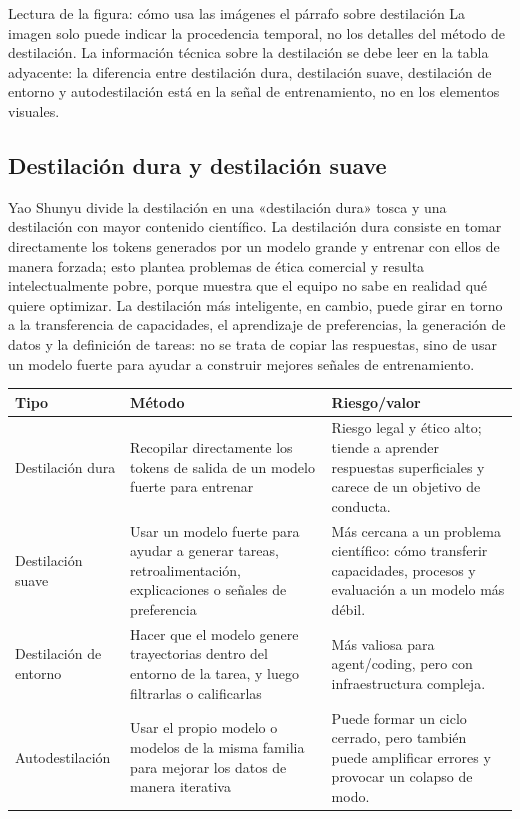 \documentclass[a4paper]{article}
\begin{document}
\begin{knowledgebox}{Lectura de la figura: cómo usa las imágenes el párrafo sobre destilación}
La imagen solo puede indicar la procedencia temporal, no los detalles del método de destilación. La información técnica sobre la destilación se debe leer en la tabla adyacente: la diferencia entre destilación dura, destilación suave, destilación de entorno y autodestilación está en la señal de entrenamiento, no en los elementos visuales.
\end{knowledgebox}


\subsection{Destilación dura y destilación suave}

Yao Shunyu divide la destilación en una «destilación dura» tosca y una destilación con mayor contenido científico. La destilación dura consiste en tomar directamente los tokens generados por un modelo grande y entrenar con ellos de manera forzada; esto plantea problemas de ética comercial y resulta intelectualmente pobre, porque muestra que el equipo no sabe en realidad qué quiere optimizar. La destilación más inteligente, en cambio, puede girar en torno a la transferencia de capacidades, el aprendizaje de preferencias, la generación de datos y la definición de tareas: no se trata de copiar las respuestas, sino de usar un modelo fuerte para ayudar a construir mejores señales de entrenamiento.

\noindent\begin{tabularx}{\textwidth}{p{}p{}X}
\toprule
Tipo & Método & Riesgo/valor \\
\midrule
Destilación dura & Recopilar directamente los tokens de salida de un modelo fuerte para entrenar & Riesgo legal y ético alto; tiende a aprender respuestas superficiales y carece de un objetivo de conducta. \\
Destilación suave & Usar un modelo fuerte para ayudar a generar tareas, retroalimentación, explicaciones o señales de preferencia & Más cercana a un problema científico: cómo transferir capacidades, procesos y evaluación a un modelo más débil. \\
Destilación de entorno & Hacer que el modelo genere trayectorias dentro del entorno de la tarea, y luego filtrarlas o calificarlas & Más valiosa para agent/coding, pero con infraestructura compleja. \\
Autodestilación & Usar el propio modelo o modelos de la misma familia para mejorar los datos de manera iterativa & Puede formar un ciclo cerrado, pero también puede amplificar errores y provocar un colapso de modo. \\
\bottomrule
\end{tabularx}
\end{document}
